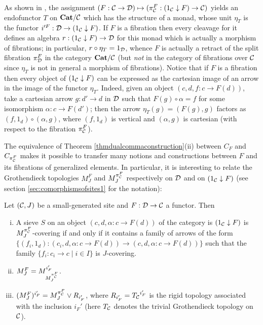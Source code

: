 \documentclass[a4paper,12pt]{article}
\begin{document}
\begin{remark}
	As shown in \cite{Kock}, the assignment $(F:{\cal C}\to {\cal D}) \mapsto ({\pi_{\cal C}^{F}}:(1_{\cal C}\downarrow F) \to {\cal C})$ yields an endofunctor $T$ on $\textbf{Cat}\slash {\cal C}$ which has the structure of a monad, whose unit $\eta_{T}$ is the functor $i'^{F}:{\cal D}\to (1_{\cal C}\downarrow F)$. If $F$ is a fibration then every cleavage for it defines an algebra $r:(1_{\cal C}\downarrow F) \to {\cal D}$ for this monad which is actually a morphism of fibrations; in particular, $r\circ \eta_{T}=1_{\cal D}$, whence $F$ is actually a retract of the split fibration $\pi_{\cal D}^{F}$ in the category $\textbf{Cat}\slash {\cal C}$ (but \emph{not} in the category of fibrations over $\cal C$ since $\eta_{T}$ is not in general a morphism of fibrations). Notice that if $F$ is a fibration then every object of $(1_{\cal C}\downarrow F)$ can be expressed as the cartesian image of an arrow in the image of the functor $\eta_{T}$. Indeed, given an object $(c,d, f:c\to F(d))$, take a cartesian arrow $g:d'\to d$ in $\cal D$ such that $F(g)\circ \alpha=f$ for some isomorphism $\alpha:c\to F(d')$; then the arrow $\eta_{T}(g)=(F(g), g)$ factors as $(f, 1_{d})\circ (\alpha, g)$, where $(f, 1_{d})$ is vertical and $(\alpha, g)$ is cartesian (with respect to the fibration $\pi_{\cal C}^{F}$).     
\end{remark}

The equivalence of Theorem \ref{thmdualcommaconstruction}(ii) between $C_{F}$ and $C_{{\pi_{\cal C}^{F}}}$ makes it possible to transfer many notions and constructions between $F$ and its fibrations of generalized elements. In particular, it is interesting to relate the Grothendieck topologies $M^{F}_{J}$ and $M^{\pi_{\cal C}^{F}}_{J}$ respectively on $\cal D$ and on $(1_{\cal C}\downarrow F)$ (see section \ref{sec:comorphismsofsites1} for the notation): 

\begin{proposition}\label{propthreepoints}
	Let $({\cal C}, J)$ be a small-generated site and $F:{\cal D}\to {\cal C}$ a functor. Then
	\begin{enumerate}[(i)]
		\item A sieve $S$ on an object $(c, d, \alpha:c\to F(d))$ of the category is $(1_{\cal C}\downarrow F)$ is $M^{\pi^{F}_{\cal C}}_{J}$-covering if and only if it contains a family of arrows of the form $\{(f_i, 1_{d}):(c_i, d, \alpha:c\to F(d)) \to (c, d, \alpha:c\to F(d))\}$ such that the family $\{f_i:c_i\to c \mid i\in I\}$ is $J$-covering.  
		
		\item $M^{F}_{J}=M_{M^{\pi_{\cal C}^{F}}_{J}}^{i_{F}'}$. 
		
		\item $({M^{F}_{J}})^{i_{F}'}=M^{\pi^{F}_{\cal C}}_{J}\vee R_{i_{F}'}$, where $R_{i_{F}'}={T_{\cal C}}^{i_{F}'}$ is the rigid topology associated with the inclusion $i_{F}'$ (here $T_{\cal C}$ denotes the trivial Grothendieck topology on $\cal C$).
	\end{enumerate}
\end{proposition}
\end{document}
